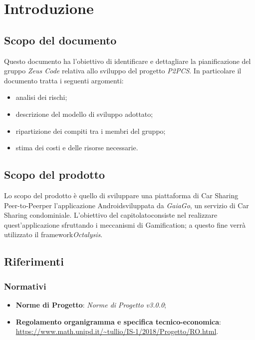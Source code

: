 \section{Introduzione}
\subsection{Scopo del documento}
Questo documento ha l'obiettivo di identificare e dettagliare la pianificazione del gruppo \textit{Zeus Code} relativa allo sviluppo del progetto \textit{P2PCS}. In particolare il documento tratta i seguenti argomenti:
\begin{itemize}
	\item analisi dei rischi;
	\item descrizione del modello di sviluppo adottato;
	\item ripartizione dei compiti tra i membri del gruppo;
	\item stima dei costi e delle risorse necessarie.
\end{itemize}
\subsection{Scopo del prodotto}
Lo scopo del prodotto è quello di sviluppare una piattaforma di Car Sharing Peer-to-Peer\glosp per l'applicazione Android\glosp sviluppata da \textit{GaiaGo}, un servizio di Car Sharing condominiale. L'obiettivo del capitolato\glosp consiste nel realizzare quest'applicazione sfruttando i meccanismi di Gamification\glo; a questo fine
verrà utilizzato il framework\glosp \textit{Octalysis}\glo.
\subsection{Riferimenti}
\subsubsection{Normativi}
\begin{itemize}
	\item \textbf{Norme di Progetto}: \textit{Norme di Progetto v3.0.0};
	\item \textbf{Regolamento organigramma e specifica tecnico-economica}: \\
	\url{https://www.math.unipd.it/~tullio/IS-1/2018/Progetto/RO.html}.
\end{itemize}

